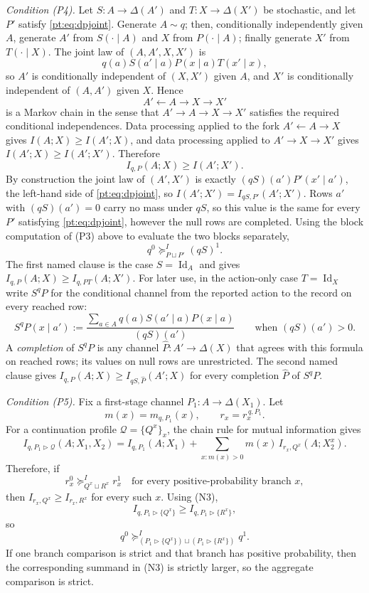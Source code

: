 \documentclass[11pt,a4paper]{article}
\theoremstyle{definition}
\newcommand{\Id}{\operatorname{Id}}
\newcommand{\1}{\mathbf 1}
\begin{document}
\emph{Condition \textup{(P4)}.}
Let $S:A\to\Delta(A')$ and $T:X\to\Delta(X')$ be stochastic, and let $P'$ satisfy \eqref{pt:eq:dpjoint}.  Generate
$A\sim q$; then, conditionally independently given $A$, generate $A'$ from $S(\cdot\mid A)$ and $X$ from
$P(\cdot\mid A)$; finally generate $X'$ from $T(\cdot\mid X)$.  The joint law of $(A,A',X,X')$ is
\[
q(a)S(a'\mid a)P(x\mid a)T(x'\mid x),
\]
so $A'$ is conditionally independent of $(X,X')$ given $A$, and $X'$ is conditionally independent of $(A,A')$ given $X$.
Hence
\[
A'\longleftarrow A\longrightarrow X\longrightarrow X'
\]
is a Markov chain in the sense that $A'\to A\to X\to X'$ satisfies the required conditional independences.  Data
processing applied to the fork $A'\leftarrow A\to X$ gives $I(A;X)\ge I(A';X)$, and data processing applied to
$A'\to X\to X'$ gives $I(A';X)\ge I(A';X')$.  Therefore
\[
I_{q,P}(A;X)\ge I(A';X').
\]
By construction the joint law of $(A',X')$ is exactly $(qS)(a')P'(x'\mid a')$, the left-hand side of
\eqref{pt:eq:dpjoint}, so $I(A';X')=I_{qS,P'}(A';X')$.  Rows $a'$ with $(qS)(a')=0$ carry no mass under $qS$, so this value
is the same for every $P'$ satisfying \eqref{pt:eq:dpjoint}, however the null rows are completed.  Using the block
computation of \textup{(P3)} above to evaluate the two blocks separately,
\[
q^0\succeq^I_{P\sqcup P'}(qS)^1.
\]
The first named clause is the case $S=\Id_A$ and gives
$I_{q,P}(A;X)\ge I_{q,PT}(A;X')$.  For later use, in the action-only case $T=\Id_X$ write $S^qP$ for the conditional
channel from the reported action to the record on every reached row:
\[
S^qP(x\mid a')
:=
\frac{\sum_{a\in A}q(a)S(a'\mid a)P(x\mid a)}{(qS)(a')}
\qquad\text{when }(qS)(a')>0.
\]
A \emph{completion} of $S^qP$ is any channel $\widehat P:A'\to\Delta(X)$ that agrees with this formula on reached rows;
its values on null rows are unrestricted.  The second named clause gives
$I_{q,P}(A;X)\ge I_{qS,\widehat P}(A';X)$ for every completion $\widehat P$ of $S^qP$.

\emph{Condition \textup{(P5)}.}
Fix a first-stage channel $P_1:A\to\Delta(X_1)$.  Let
\[
m(x)=m_{q,P_1}(x),
\qquad
r_x=r_x^{\,q,P_1}.
\]
For a continuation profile $\mathcal Q=\{Q^x\}_x$, the chain rule for mutual information gives
\[
I_{q,P_1\triangleright\mathcal Q}(A;X_1,X_2)
=
I_{q,P_1}(A;X_1)
+
\sum_{x:m(x)>0}m(x)\,I_{r_x,Q^x}(A;X_2^x).
\tag{N3}
\]
Therefore, if
\[
r_x^0\succeq^I_{Q^x\sqcup R^x}r_x^1
\quad\text{for every positive-probability branch }x,
\]
then $I_{r_x,Q^x}\ge I_{r_x,R^x}$ for every such $x$.  Using (N3),
\[
I_{q,P_1\triangleright\{Q^x\}}
\ge
I_{q,P_1\triangleright\{R^x\}},
\]
so
\[
q^0
\succeq^I_{(P_1\triangleright\{Q^x\})\sqcup(P_1\triangleright\{R^x\})}
q^1.
\]
If one branch comparison is strict and that branch has positive probability, then the corresponding summand in (N3) is
strictly larger, so the aggregate comparison is strict.
\end{document}
